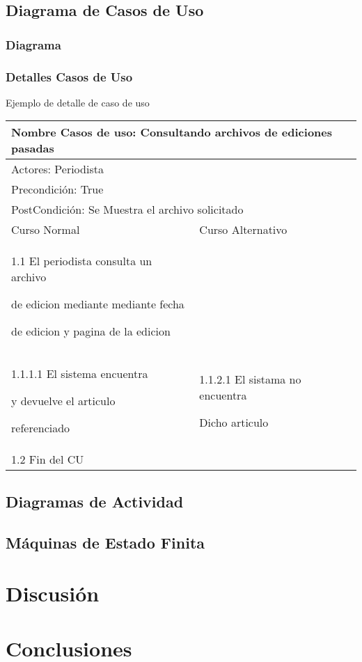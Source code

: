 \documentclass[a4paper,10pt]{article}
\begin{document}
\subsection*{Diagrama de Casos de Uso}

\subsubsection*{Diagrama}

\subsubsection*{Detalles Casos de Uso}


Ejemplo de detalle de caso de uso
\begin{center}
\begin{tabularx}{14cm}{|X|X|}
\hline
\multicolumn{2}{|l|}{Nombre Casos de uso: Consultando archivos de ediciones pasadas}\\
\hline
\multicolumn{2}{|l|}{Actores: Periodista}\\
\hline
\multicolumn{2}{|l|}{Precondici\'on: True}\\
\hline
\multicolumn{2}{|l|}{PostCondici\'on: Se Muestra el archivo solicitado}\\
\hline
Curso Normal & Curso Alternativo\\
\hline
1.1 El periodista consulta un archivo

de edicion mediante mediante fecha

de edicion y pagina de la edicion  & 

\\
\hline
1.1.1.1 El sistema encuentra

y devuelve el articulo 

referenciado &

1.1.2.1 El sistama no encuentra 

Dicho articulo\\
\hline
1.2 Fin del CU & \\
\hline
\end{tabularx}

\end{center}

\subsection*{Diagramas de Actividad}

\subsection*{M\'aquinas de Estado Finita}


\newpage


\section*{Discusi\'on}




\newpage
\section*{Conclusiones}
\end{document}
